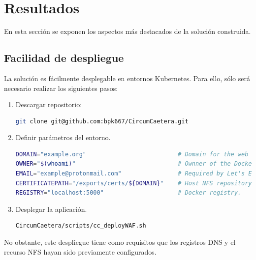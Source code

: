 \chapter {Resultados}
\par En esta sección se exponen los aspectos más destacados de la solución construida.

\section{Facilidad de despliegue}
\par La solución es fácilmente desplegable en entornos Kubernetes. Para ello, sólo será necesario realizar los siguientes pasos:
\begin{enumerate}
  \item Descargar repositorio: \\
		\begin{minipage}{\linewidth}
		\begin{lstlisting}[language=bash]
git clone git@github.com:bpk667/CircumCaetera.git
		\end{lstlisting}
		\end{minipage}
  \item Definir parámetros del entorno. \\
		\begin{minipage}{\linewidth}
		\begin{lstlisting}[language=bash]
DOMAIN="example.org"                          # Domain for the web services.
OWNER="$(whoami)"                             # Ownner of the Docker registry.
EMAIL="example@protonmail.com"                # Required by Let's Encrypt.
CERTIFICATEPATH="/exports/certs/${DOMAIN}"    # Host NFS repository for sharing certificates.
REGISTRY="localhost:5000"                     # Docker registry.
		\end{lstlisting}
		\end{minipage}
  \item Desplegar la aplicación. \\
		\begin{minipage}{\linewidth}
		\begin{lstlisting}[language=bash]
CircumCaetera/scripts/cc_deployWAF.sh
		\end{lstlisting}
		\end{minipage}
\end{enumerate}

No obstante, este despliegue tiene como requisitos que los registros DNS y el recurso NFS hayan sido previamente configurados.

